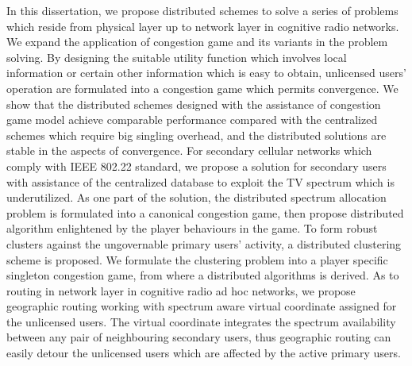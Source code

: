 In this dissertation, we propose distributed schemes to solve a series of problems which reside from physical layer up to network layer in cognitive radio networks.
We expand the application of congestion game and its variants in the problem solving.
By designing the suitable utility function which involves local information or certain other information which is easy to obtain, unlicensed users' operation are formulated into a congestion game which permits convergence.
We show that the distributed schemes designed with the assistance of congestion game model achieve comparable performance compared with the centralized schemes which require big singling overhead, and the distributed solutions are stable in the aspects of convergence.
%
For secondary cellular networks which comply with IEEE 802.22 standard, we propose a solution for secondary users with assistance of the centralized database to exploit the TV spectrum which is underutilized.
As one part of the solution, the distributed spectrum allocation problem is formulated into a canonical congestion game, then propose distributed algorithm enlightened by the player behaviours in the game.
%
To form robust clusters against the ungovernable primary users' activity, a distributed clustering scheme is proposed.
We formulate the clustering problem into a player specific singleton congestion game, from where a distributed algorithms is derived.
%
As to routing in network layer in cognitive radio ad hoc networks, we propose geographic routing working with spectrum aware virtual coordinate assigned for the unlicensed users.
The virtual coordinate integrates the spectrum availability between any pair of neighbouring secondary users, thus geographic routing can easily detour the unlicensed users which are affected by the active primary users.
%


